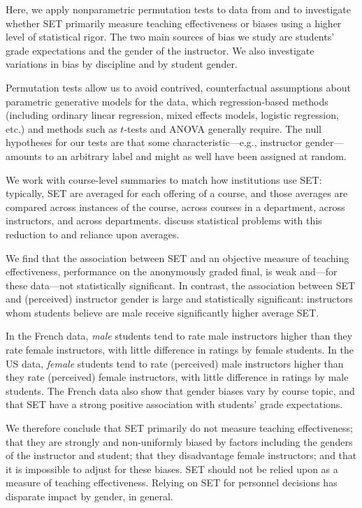 \documentclass[12pt]{article}
\begin{document}
Here, we apply nonparametric permutation tests to data from \citet{Boring2015} and 
\citet{MacNell2014} to investigate whether SET primarily measure teaching effectiveness or 
biases using a higher level of statistical rigor.
The two main sources of bias we study are students' grade expectations and the gender of the 
instructor. 
We also investigate variations in bias by discipline and by student gender.

Permutation tests allow us to avoid 
contrived, counterfactual assumptions about
parametric generative models for the data, which regression-based methods (including
ordinary linear regression, mixed effects models, logistic regression, etc.) and
methods such as $t$-tests and ANOVA generally require.
The null hypotheses for our tests are that some 
characteristic---e.g., instructor gender---amounts to an arbitrary label and might as well
have been assigned at random. 

We work with course-level summaries to match how institutions use SET: 
typically, SET are averaged for each offering of a course, and those averages are 
compared across instances of the course,
across courses in a department, across instructors, and across departments.
\citet{StarkFreishtat2014} discuss statistical problems with this reduction to 
and reliance upon averages.

We find that the association between SET and an objective measure of teaching effectiveness,
performance on the anonymously graded final, 
is weak and---for these data---not statistically significant.
In contrast, the association between SET and (perceived) instructor gender 
is large and statistically significant:
instructors whom students believe are male receive significantly higher average SET.

In the French data, \emph{male} students tend to rate male instructors higher
than they rate female instructors, with little difference in ratings by female students.
In the US data, \emph{female} students tend to rate (perceived) male instructors 
higher than they rate (perceived) female instructors, with little difference in ratings by male students. 
The French data also show that gender biases vary by course topic, and 
that SET have a strong positive association with students' grade expectations.

We therefore conclude that SET primarily do not measure teaching effectiveness; that 
they are strongly and non-uniformly biased by factors including the genders of the instructor
and student; that they disadvantage female instructors;
and that it is impossible to adjust for these biases. 
SET should not be relied upon as a measure of teaching effectiveness.
Relying on SET for personnel decisions has disparate impact by gender, in general. 
\end{document}
